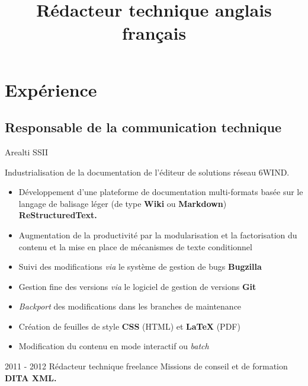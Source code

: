 \documentclass[12pt,a4paper,roman]{moderncv}
\title{Rédacteur technique anglais français}
\begin{document}
\makecvtitle %


\section{Expérience}

\subsection{Responsable de la communication technique}

        {Arealti}
        {SSII}
        {}
        {}
        {Industrialisation de la documentation de l'éditeur de solutions réseau
          6WIND.
          \begin{itemize}
          \item Développement d'une plateforme de documentation multi-formats
            basée sur le langage de balisage léger (de type \textbf{Wiki} ou
            \textbf{Markdown}) \textbf{ReStructuredText.}
          \item Augmentation de la productivité par la modularisation et la
            factorisation du contenu et la mise en place de mécanismes de texte
            conditionnel
          \item Suivi des modifications \textit{via} le système de gestion de
            bugs \textbf{Bugzilla}
          \item Gestion fine des versions \textit{via} le logiciel de gestion de
            versions \textbf{Git}
          \item \textit{Backport} des modifications dans les branches de
            maintenance
          \item Création de feuilles de style \textbf{CSS} (HTML) et
            \textbf{\LaTeX} (PDF)
          \item Modification du contenu en mode interactif ou \textit{batch}
        \end{itemize}
    }


\cventry
    {2011 - 2012}
    {Rédacteur technique freelance}
    {\textsc{}}
    {}
    {}
    {Missions de conseil et de formation \textbf{DITA XML.}}
\end{document}
